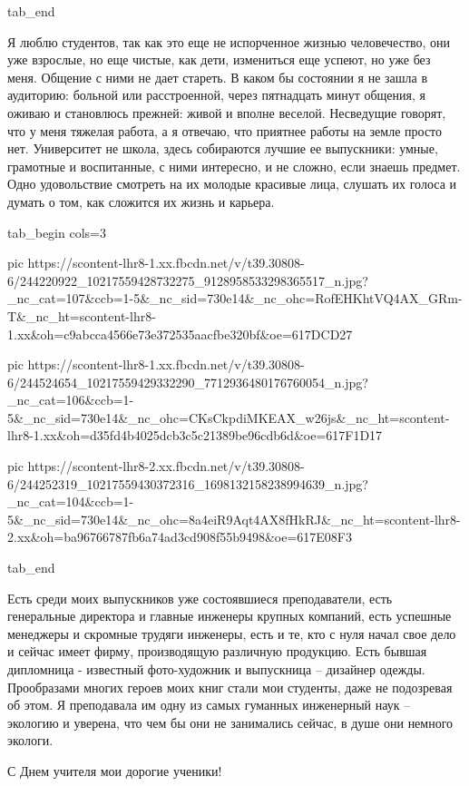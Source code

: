   tab_end
\fi

Я люблю студентов, так как это еще не испорченное жизнью человечество, они уже
взрослые, но еще чистые, как дети, измениться еще успеют, но уже без меня.
Общение с ними не дает стареть. В каком бы состоянии я не зашла в аудиторию:
больной или расстроенной, через пятнадцать минут общения, я оживаю и становлюсь
прежней: живой и вполне веселой. Несведущие говорят, что у меня тяжелая работа,
а я отвечаю, что приятнее работы на земле просто нет. Университет не школа,
здесь собираются лучшие ее выпускники: умные, грамотные и воспитанные, с ними
интересно, и не сложно, если знаешь предмет. Одно удовольствие смотреть на их
молодые красивые лица, слушать их голоса и думать о том, как сложится их жизнь
и карьера. 

\ifcmt
  tab_begin cols=3

     pic https://scontent-lhr8-1.xx.fbcdn.net/v/t39.30808-6/244220922_10217559428732275_9128958533298365517_n.jpg?_nc_cat=107&ccb=1-5&_nc_sid=730e14&_nc_ohc=RofEHKhtVQ4AX_GRm-T&_nc_ht=scontent-lhr8-1.xx&oh=c9abcca4566e73e372535aacfbe320bf&oe=617DCD27

     pic https://scontent-lhr8-1.xx.fbcdn.net/v/t39.30808-6/244524654_10217559429332290_7712936480176760054_n.jpg?_nc_cat=106&ccb=1-5&_nc_sid=730e14&_nc_ohc=CKsCkpdiMKEAX_w26js&_nc_ht=scontent-lhr8-1.xx&oh=d35fd4b4025dcb3c5c21389be96cdb6d&oe=617F1D17

     pic https://scontent-lhr8-2.xx.fbcdn.net/v/t39.30808-6/244252319_10217559430372316_1698132158238994639_n.jpg?_nc_cat=104&ccb=1-5&_nc_sid=730e14&_nc_ohc=8a4eiR9Aqt4AX8fHkRJ&_nc_ht=scontent-lhr8-2.xx&oh=ba96766787fb6a74ad3cd908f55b9498&oe=617E08F3

  tab_end
\fi

Есть среди моих выпускников уже состоявшиеся преподаватели, есть генеральные
директора и главные инженеры крупных компаний, есть успешные менеджеры и
скромные трудяги инженеры, есть и те, кто с нуля начал свое дело и сейчас имеет
фирму, производящую различную продукцию. Есть бывшая дипломница - известный
фото-художник и выпускница – дизайнер одежды. Прообразами многих героев моих
книг стали мои студенты, даже не подозревая об этом. Я преподавала им одну из
самых гуманных инженерный наук – экологию и уверена, что чем бы они не
занимались сейчас, в душе они немного экологи.

С Днем учителя мои дорогие ученики!



